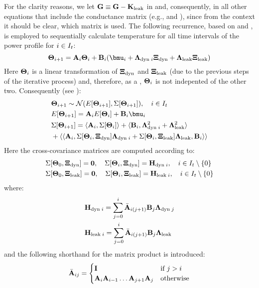 For the clarity reasons, we let $\mathbf{G} \equiv \mathbf{G} - \mathbf{K}_{\text{leak}}$ in  and, consequently, in all other equations that include the conductance matrix (e.g.,  and ), since from the context it should be clear, which matrix is used. The following recurrence, based on  and , is employed to sequentially calculate temperature for all time intervals of the power profile for $i \in I_t$:
\begin{equation} \equlabel{tta-fourier-recurrence}
  \vtemp_{i + 1} = \m{A}_i \vtemp_i + \m{B}_i (\vmean{i} + \ddev{\dyn \; i} \vnormal_\dyn + \ddev{\leak} \vnormal_\leak)
\end{equation}
Here $\mathbf{\Theta}_i$ is a linear transformation of $\mathbf{\Xi}_{\text{dyn}}$ and $\mathbf{\Xi}_{\text{leak}}$ (due to the previous steps of the iterative process) and, therefore, as a \rv, $\mathbf{\Theta}_i$ is not indepented of the other two. Consequently (see ):
\begin{align*}
  & \vtemp_{i + 1} \sim \normal(\expect{\vtemp_{i + 1}}, \cov{\vtemp_{i + 1}}), \sep i \in \timeindex \\
  & \expect{\vtemp_{i + 1}} = \m{A}_i \expect{\vtemp_i} + \m{B}_i \vmean{i} \\
  & \cov{\vtemp_{i + 1}} = \dbl{\m{A}_i, \cov{\vtemp_i}} + \dbl{\m{B}_i , \ddev{\dyn \; i}^2 + \ddev{\leak}^2} \\
  & {} + \dbl{\dbl{\m{A}_i, \cov{\vtemp_i, \vnormal_\dyn} \ddev{\dyn \; i} + \cov{\vtemp_i, \vnormal_\leak} \ddev{\leak}, \m{B}_i}}
\end{align*}
Here the cross-covariance matrices are computed according to:
\begin{align*}
  & \Sigma[\mathbf{\Theta}_0, \mathbf{\Xi}_{\text{dyn}}] = \mathbf{0}, \hspace{10pt} \Sigma[\mathbf{\Theta}_i, \mathbf{\Xi}_{\text{dyn}}] = \mathbf{H}_{\text{dyn} \; i}, \hspace{10pt} i \in I_t \setminus \{0\} \\
  & \Sigma[\mathbf{\Theta}_0, \mathbf{\Xi}_{\text{leak}}] = \mathbf{0}, \hspace{10pt} \Sigma[\mathbf{\Theta}_i, \mathbf{\Xi}_{\text{leak}}] = \mathbf{H}_{\text{leak} \; i}, \hspace{10pt} i \in I_t \setminus \{0\}
\end{align*}
where:
\begin{align}
  & \m{H}_{\dyn \; i} = \sum_{j = 0}^i \am{A}_{i(j + 1)} \m{B}_j \ddev{\dyn \; j} \equlabel{h-dynamic} \\
  & \m{H}_{\leak \; i} = \sum_{j = 0}^i \am{A}_{i(j + 1)} \m{B}_j \ddev{\leak} \equlabel{h-leakage}
\end{align}
and the following shorthand for the matrix product is introduced:
\[
  \Bar{\mathbf{A}}_{ij} = \begin{cases}
    \mathbf{I} & \mbox{if } j > i \\
    \mathbf{A}_i \mathbf{A}_{i - 1} \dots \mathbf{A}_{j + 1} \mathbf{A}_j & \mbox{otherwise}
  \end{cases}
\]

